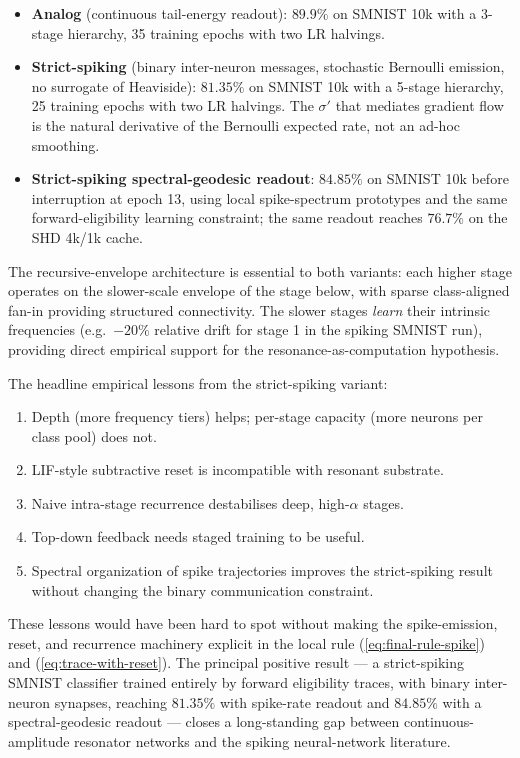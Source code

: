 \documentclass[11pt]{article}
\begin{document}
\begin{itemize}[itemsep=2pt]
\item \textbf{Analog} (continuous tail-energy readout):
$89.9\%$ on SMNIST 10k with a 3-stage hierarchy, 35 training epochs
with two LR halvings.
\item \textbf{Strict-spiking} (binary inter-neuron messages,
stochastic Bernoulli emission, no surrogate of Heaviside):
$81.35\%$ on SMNIST 10k with a 5-stage hierarchy, 25 training
epochs with two LR halvings. The $\sigma'$ that mediates gradient
flow is the natural derivative of the Bernoulli expected rate, not
an ad-hoc smoothing.
\item \textbf{Strict-spiking spectral-geodesic readout}:
$84.85\%$ on SMNIST 10k before interruption at epoch 13, using
local spike-spectrum prototypes and the same forward-eligibility
learning constraint; the same readout reaches $76.7\%$ on the
SHD 4k/1k cache.
\end{itemize}

The recursive-envelope architecture is essential to both variants:
each higher stage operates on the slower-scale envelope of the
stage below, with sparse class-aligned fan-in providing structured
connectivity. The slower stages \emph{learn} their intrinsic
frequencies (e.g.\ $-20\%$ relative drift for stage 1 in the spiking
SMNIST run), providing direct empirical support for the
resonance-as-computation hypothesis.

The headline empirical lessons from the strict-spiking variant:
\begin{enumerate}[itemsep=1pt]
\item Depth (more frequency tiers) helps; per-stage capacity (more
neurons per class pool) does not.
\item LIF-style subtractive reset is incompatible with resonant
substrate.
\item Naive intra-stage recurrence destabilises deep, high-$\alpha$
stages.
\item Top-down feedback needs staged training to be useful.
\item Spectral organization of spike trajectories improves the
strict-spiking result without changing the binary communication
constraint.
\end{enumerate}

These lessons would have been hard to spot without making the
spike-emission, reset, and recurrence machinery explicit in the
local rule (\ref{eq:final-rule-spike}) and (\ref{eq:trace-with-reset}).
The principal positive result --- a strict-spiking SMNIST classifier
trained entirely by forward eligibility traces, with binary
inter-neuron synapses, reaching $81.35\%$ with spike-rate readout and
$84.85\%$ with a spectral-geodesic readout --- closes a long-standing
gap between continuous-amplitude resonator networks and the spiking
neural-network literature.
\end{document}
